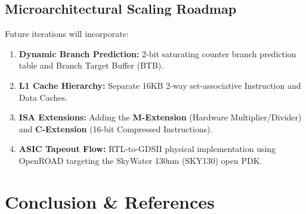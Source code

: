 \documentclass[10.5pt,a4paper]{article}
\begin{document}
\subsection{Microarchitectural Scaling Roadmap}
Future iterations will incorporate:
\begin{enumerate}
  \setlength\itemsep{1pt}
  \item \textbf{Dynamic Branch Prediction:} 2-bit saturating counter branch prediction table and Branch Target Buffer (BTB).
  \item \textbf{L1 Cache Hierarchy:} Separate 16KB 2-way set-associative Instruction and Data Caches.
  \item \textbf{ISA Extensions:} Adding the \textbf{M-Extension} (Hardware Multiplier/Divider) and \textbf{C-Extension} (16-bit Compressed Instructions).
  \item \textbf{ASIC Tapeout Flow:} RTL-to-GDSII physical implementation using OpenROAD targeting the SkyWater 130nm (SKY130) open PDK.
\end{enumerate}

\vspace{0.4cm}


\section{Conclusion \& References}
\end{document}
